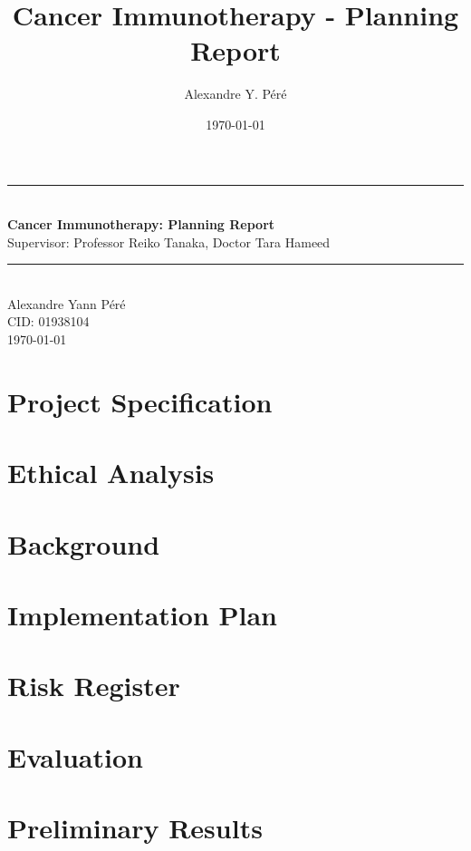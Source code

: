 \documentclass[11pt]{article}
\title{Cancer Immunotherapy - Planning Report}
\author{Alexandre Y. Péré}
\date{\today}
\begin{document}
\begin{titlepage}
    \newcommand{\HRule}{\rule{\linewidth}{0.5mm}}
    \begin{center}
        \HRule \\[0.4cm]
    { \huge \bfseries Cancer Immunotherapy: Planning Report \\[0.15cm] }
    Supervisor: Professor Reiko Tanaka, Doctor Tara Hameed 
    \\[0.4cm]
    \HRule \\[0.5cm]
    Alexandre Yann Péré \\[0.1cm]
    CID: 01938104  \\[0.1cm]
    \today \\ [0.1cm]
    \end{center}
\end{titlepage}

\tableofcontents

\section{Project Specification}



\section{Ethical Analysis}

\section{Background}

\section{Implementation Plan}

\section{Risk Register}

\section{Evaluation}

\section{Preliminary Results}
\end{document}
